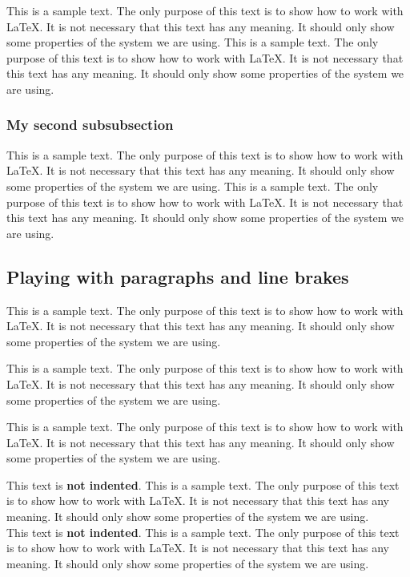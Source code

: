 \documentclass[10pt, paper=a4, abstracton]{scrartcl}
\begin{document}
This is a sample text. The only purpose of this text is to show how to work with \LaTeX . It is not necessary that this text has any meaning. It should only show some properties of the system we are using. This is a sample text. The only purpose of this text is to show how to work with \LaTeX . It is not necessary that this text has any meaning. It should only show some properties of the system we are using. 


\subsubsection[Second subsubsection]{My second subsubsection}

This is a sample text. The only purpose of this text is to show how to work with \LaTeX . It is not necessary that this text has any meaning. It should only show some properties of the system we are using. This is a sample text. The only purpose of this text is to show how to work with \LaTeX . It is not necessary that this text has any meaning. It should only show some properties of the system we are using. 


\subsection[Paragraphs and line brakes]{Playing with paragraphs and line brakes}

This is a sample text. The only purpose of this text is to show how to work with \LaTeX . It is not necessary that this text has any meaning. It should only show some properties of the system we are using. \par 

This is a sample text. The only purpose of this text is to show how to work with \LaTeX . It is not necessary that this text has any meaning. It should only show some properties of the system we are using. 

This is a sample text. The only purpose of this text is to show how to work with \LaTeX . It is not necessary that this text has any meaning. It should only show some properties of the system we are using. 

\noindent This text is \textbf{not indented}. This is a sample text. The only purpose of this text is to show how to work with \LaTeX . It is not necessary that this text has any meaning. It should only show some properties of the system we are using. \\
This text is \textbf{not indented}. This is a sample text. The only purpose of this text is to show how to work with \LaTeX . It is not necessary that this text has any meaning. It should only show some properties of the system we are using. 
\end{document}
